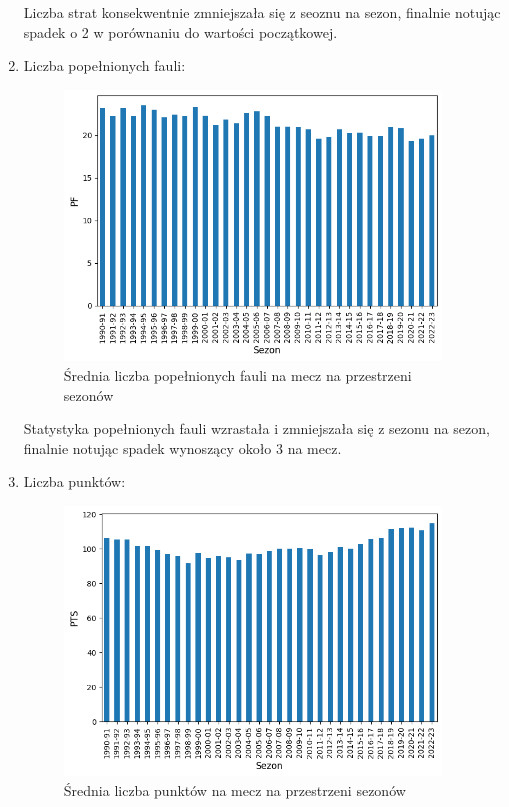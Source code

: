 \documentclass{article}
\begin{document}
\begin{enumerate}
        Liczba strat konsekwentnie zmniejszała się z seoznu na sezon, finalnie notując spadek o 2 w porównaniu do wartości początkowej.
\newpage             
        \item Liczba popełnionych fauli:
            \begin{figure}[H]
                \centering
                \includegraphics[width=10cm]{wykres_PF.png}
                \caption{Średnia liczba popełnionych fauli na mecz na przestrzeni sezonów}
                \label{fig:wykres_PF}
            \end{figure}

        Statystyka popełnionych fauli wzrastała i zmniejszała się z sezonu na   sezon, finalnie notując spadek wynoszący około 3 na mecz.
\newpage         
        \item Liczba punktów:
            \begin{figure}[H]
                \centering
                \includegraphics[width=10cm]{wykres_PTS.png}
                \caption{Średnia liczba punktów na mecz na przestrzeni sezonów}
                \label{fig:wykres_PTS}
            \end{figure}
            

\end{enumerate}
\end{document}
